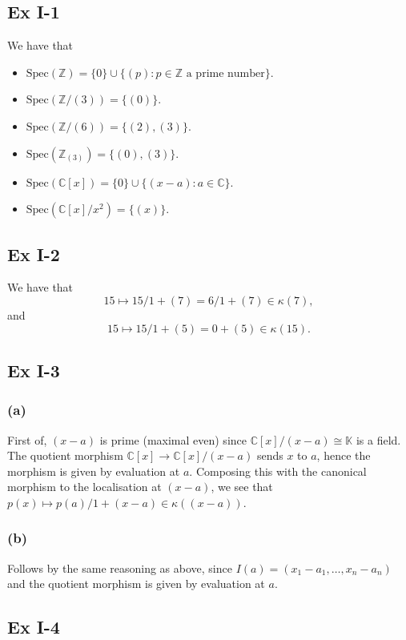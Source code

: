 \documentclass{article}
\theoremstyle{definition}
\newcommand{\Z}{\mathbb{Z}}
\newcommand{\C}{\mathbb{C}}
\newcommand{\K}{\mathbb{K}}
\newcommand{\Spec}{\text{Spec}}
\begin{document}
\subsection*{Ex I-1}

We have that 
\begin{itemize}
	\item $\Spec(\Z) = \{0\} \cup \{(p) : p \in \Z \text{ a prime number}\}$.
	\item $\Spec(\Z/(3)) = \{(0)\}$.
	\item $\Spec(\Z/(6)) = \{(2), (3)\}$.
	\item $\Spec(\Z_{(3)}) = \{(0), (3)\}$.
	\item $\Spec(\C[x]) = \{0\} \cup \{(x - a) : a \in \C \}$.
	\item $\Spec(\C[x]/x^2) = \{(x)\}$.
\end{itemize}

\subsection*{Ex I-2}
We have that 
\[
	15 
	\mapsto 
	15/1 + (7) 
	=  
	6/1 + (7)
	\in \kappa(7),
\]
and  
\[
	15 
	\mapsto 
	15/1 + (5) 
	=  
	0 + (5)
	\in \kappa(15).
\]

\subsection*{Ex I-3}
\subsubsection*{(a)}

First of, $(x - a)$ is prime (maximal even) since $\C[x]/(x-a) \cong \K$ is a
field. The quotient morphism $\C[x] \to \C[x]/(x - a)$ sends $x$ to $a$, hence
the morphism is given by evaluation at $a$. Composing this with the canonical
morphism to the localisation at $(x - a)$, we see that $p(x) \mapsto p(a)/1 +
(x - a) \in \kappa((x-a))$.

\subsubsection*{(b)}
Follows by the same reasoning as above, since $I(a) = (x_1 - a_1, \ldots, x_n - a_n)$
and the quotient morphism is given by evaluation at $a$.

\subsection*{Ex I-4}
\end{document}

